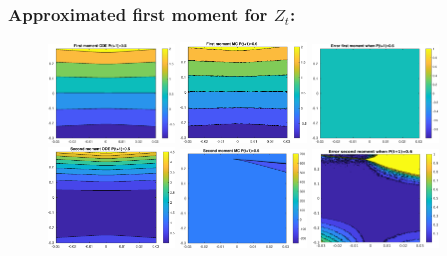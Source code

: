 \documentclass[aspectratio=169]{beamer}\usepackage[utf8]{inputenc}
\begin{document}
\begin{frame}\frametitle{Approximated first moment for $Z_t$:}

\begin{figure}[ht!]
\centering
\includegraphics[width=0.3\textwidth]{../../MATLAB_Files/Results/moments/lamperti/errors/fm_ODE_5.eps}\quad
\includegraphics[width=0.3\textwidth]{../../MATLAB_Files/Results/moments/lamperti/errors/fm_MC_5.eps}\quad
\includegraphics[width=0.3\textwidth]{../../MATLAB_Files/Results/moments/lamperti/errors/fm_5.eps}\quad
\includegraphics[width=0.3\textwidth]{../../MATLAB_Files/Results/moments/lamperti/errors/sm_ODE_5.eps}\quad
\includegraphics[width=0.3\textwidth]{../../MATLAB_Files/Results/moments/lamperti/errors/sm_MC_5.eps}\quad
\includegraphics[width=0.3\textwidth]{../../MATLAB_Files/Results/moments/lamperti/errors/sm_5.eps}
\end{figure}

\end{frame}
\end{document}

